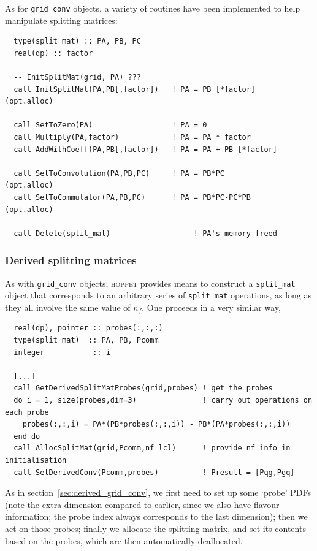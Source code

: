 \documentclass[12pt]{article}
\newcommand{\hoppet}{\textsc{hoppet}\xspace}
\newcommand{\ttt}[1]{\texttt{#1}}
\begin{document}
As for \ttt{grid\_conv} objects, a variety of routines have been
implemented to help manipulate splitting matrices:
\begin{verbatim}
  type(split_mat) :: PA, PB, PC
  real(dp) :: factor

  -- InitSplitMat(grid, PA) ???
  call InitSplitMat(PA,PB[,factor])   ! PA = PB [*factor]   (opt.alloc)

  call SetToZero(PA)                  ! PA = 0
  call Multiply(PA,factor)            ! PA = PA * factor               
  call AddWithCoeff(PA,PB[,factor])   ! PA = PA + PB [*factor]

  call SetToConvolution(PA,PB,PC)     ! PA = PB*PC          (opt.alloc)
  call SetToCommutator(PA,PB,PC)      ! PA = PB*PC-PC*PB    (opt.alloc)
  
  call Delete(split_mat)                   ! PA's memory freed
\end{verbatim}


\subsubsection{Derived splitting matrices}
\label{sec:derived-split-matrices}

As with \ttt{grid\_conv} objects, \hoppet provides means to construct
a \ttt{split\_mat} object that corresponds to an arbitrary series of
\ttt{split\_mat} operations, as long as they all involve the same
value of $n_f$. One proceeds in a very similar way,
\begin{verbatim}
  real(dp), pointer :: probes(:,:,:)
  type(split_mat)  :: PA, PB, Pcomm
  integer           :: i

  [...]
  call GetDerivedSplitMatProbes(grid,probes) ! get the probes
  do i = 1, size(probes,dim=3)               ! carry out operations on each probe
    probes(:,:,i) = PA*(PB*probes(:,:,i)) - PB*(PA*probes(:,:,i))
  end do
  call AllocSplitMat(grid,Pcomm,nf_lcl)      ! provide nf info in initialisation
  call SetDerivedConv(Pcomm,probes)          ! Presult = [Pqg,Pgq]
\end{verbatim}
As in section~\ref{sec:derived_grid_conv}, we first need to set up
some `probe' PDFs (note the extra dimension compared to earlier, since
we also have flavour information; the probe index always corresponds
to the last dimension); then we act on those probes; finally we
allocate the splitting matrix, and set its contents based on the
probes, which are then automatically deallocated.
\end{document}
